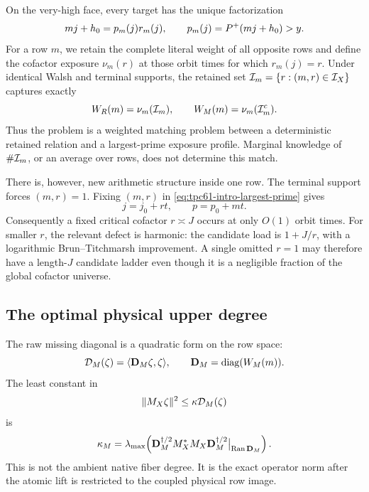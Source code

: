 On the very-high face, every target has the unique factorization
\begin{equation}
 mj+h_0=p_m(j)r_m(j),
 \qquad p_m(j)=P^{+}(mj+h_0)>y.
 \label{eq:tpc61-intro-largest-prime}
\end{equation}
For a row \(m\), we retain the complete literal weight of all opposite rows
and define the cofactor exposure \(\nu_m(r)\) at those orbit times for which
\(r_m(j)=r\).  Under identical Walsh and terminal supports, the retained set
\(\mathcal I_m=\{r:(m,r)\in\mathcal I_X\}\) captures exactly
\begin{equation}
 W_R(m)=\nu_m(\mathcal I_m),
 \qquad
 W_M(m)=\nu_m(\mathcal I_m^c).
 \label{eq:tpc61-intro-exposure-split}
\end{equation}
Thus the problem is a weighted matching problem between a deterministic
retained relation and a largest-prime exposure profile.  Marginal knowledge
of \(\#\mathcal I_m\), or an average over rows, does not determine this match.

There is, however, new arithmetic structure inside one row.  The terminal
support forces \((m,r)=1\).  Fixing \((m,r)\) in
\eqref{eq:tpc61-intro-largest-prime} gives
\begin{equation}
 j=j_0+rt,
 \qquad
 p=p_0+mt.
 \label{eq:tpc61-intro-row-ladder}
\end{equation}
Consequently a fixed critical cofactor \(r\asymp J\) occurs at only
\(O(1)\) orbit times.  For smaller \(r\), the relevant defect is harmonic:
the candidate load is \(1+J/r\), with a logarithmic Brun--Titchmarsh
improvement.  A single omitted \(r=1\) may therefore have a length-\(J\)
candidate ladder even though it is a negligible fraction of the global
cofactor universe.

\subsection{The optimal physical upper degree}

The raw missing diagonal is a quadratic form on the row space:
\begin{equation}
 \mathcal D_M(\zeta)=\langle\mathbf D_M\zeta,\zeta\rangle,
 \qquad
 \mathbf D_M=\operatorname{diag}(W_M(m)).
 \label{eq:tpc61-intro-DM}
\end{equation}
The least constant in
\begin{equation}
 \|M_X\zeta\|^2\le\kappa\mathcal D_M(\zeta)
 \label{eq:tpc61-intro-kappa-inequality}
\end{equation}
is
\begin{equation}
 \kappa_M
 =\lambda_{\max}\!\left(
 \mathbf D_M^{\dagger/2}M_X^*M_X\mathbf D_M^{\dagger/2}
 \big|_{\operatorname{Ran}\mathbf D_M}\right).
 \label{eq:tpc61-intro-kappa}
\end{equation}
This is not the ambient native fiber degree.  It is the exact operator norm
after the atomic lift is restricted to the coupled physical row image.

